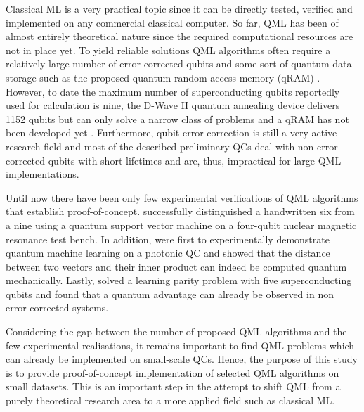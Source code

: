 \documentclass[a4paper]{article}
\newcommand*{\0}{$\ket{0}$}
\newcommand*{\1}{$\ket{1}$}
\begin{document}
Classical ML is a very practical topic since it can be directly tested, verified and implemented on any commercial classical computer. So far, QML has been of almost entirely theoretical nature since the required computational resources are not in place yet. To yield reliable solutions QML algorithms often require a relatively large number of error-corrected qubits and some sort of quantum data storage such as the proposed quantum random access memory (qRAM) \citep{qRAM}. However, to date the maximum number of superconducting qubits reportedly used for calculation is nine, the D-Wave II quantum annealing device delivers 1152 qubits but can only solve a narrow class of problems and a qRAM has not been developed yet \citep{hydrogensimulation, dwave2}. Furthermore, qubit error-correction is still a very active research field and most of the described preliminary QCs deal with non error-corrected qubits with short lifetimes and are, thus, impractical for large QML implementations.

Until now there have been only few experimental verifications of QML algorithms that establish proof-of-concept. \cite{Li2015} successfully distinguished a handwritten six from a nine using a quantum support vector machine on a four-qubit nuclear magnetic resonance test bench. In addition, \cite{Cai2015} were first to experimentally demonstrate quantum machine learning on a photonic QC and showed that the distance between two vectors and their inner product can indeed be computed quantum mechanically. Lastly, \cite{Riste2015} solved a learning parity problem with five superconducting qubits and found that a quantum advantage can already be observed in non error-corrected systems.

Considering the gap between the number of proposed QML algorithms and the few experimental realisations, it remains important to find QML problems which can already be implemented on small-scale QCs. Hence, the purpose of this study is to provide proof-of-concept implementation of selected QML algorithms on small datasets. This is an important step in the attempt to shift QML from a purely theoretical research area to a more applied field such as classical ML. 

\end{document}
